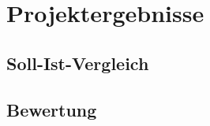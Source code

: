 
\section{Projektergebnisse}
\label{sec:projektergebnisse}

\subsection{Soll-Ist-Vergleich}
\label{subsec:soll-ist-vergleich}

\subsection{Bewertung}
\label{subsec:bewertung}